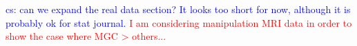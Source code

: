 \documentclass[11pt]{article}
\theoremstyle{definition}
\newcommand{\cs}[1]{\textcolor{blue}{cs: #1}}
\begin{document}
\cs{can we expand the real data section? It looks too short for now, although it is probably ok for stat journal.}
\textcolor{red}{I am considering manipulation MRI data in order to show the case where MGC > others... }
\end{document}
